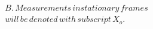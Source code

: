 \documentclass[preview]{standalone}
\begin{document}
\begin{align*}
B.\,Measurements\,in stationary\,frames\\will\,be\,denoted\,with\,subscript\,X_{o}.
\end{align*}
\end{document}

